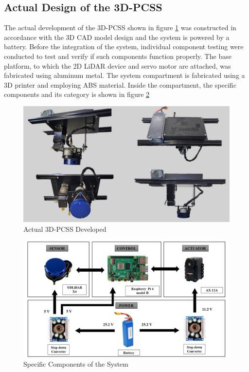 \subsection{Actual Design of the 3D-PCSS}

The actual development of the 3D-PCSS shown in figure \ref{ch4:fig:actual-3d-pcss} was constructed in accordance with the 3D CAD model design and the system is powered by a battery. Before the integration of the system, individual component testing were conducted to test and verify if such components function properly. The base platform, to which the 2D LiDAR device and servo motor are attached, was fabricated using aluminum metal. The system compartment is fabricated using a 3D printer and employing ABS material. Inside the compartment, the specific components and its category is shown in figure \ref{ch4:fig:specific-components}
\begin{figure}[H]
	\centering
	\includegraphics[width=1\textwidth]{Figures/actual-3d-pcss}
	\caption{Actual 3D-PCSS Developed}
	\label{ch4:fig:actual-3d-pcss}
\end{figure}

\begin{figure}[H]
	\centering
	\includegraphics[width=1\textwidth]{Figures/specific-components}
	\caption{Specific Components of the System}
	\label{ch4:fig:specific-components}
\end{figure}

